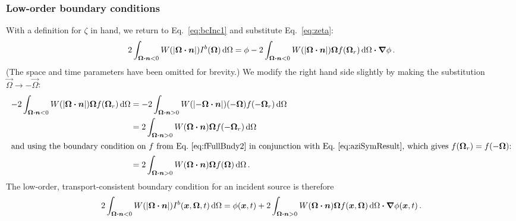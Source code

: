 \subsubsection{Low-order boundary conditions}
With a definition for $\zeta$ in hand, we return to Eq.~\eqref{eq:bcInc1} and
substitute Eq.~\eqref{eq:zeta}:
\begin{equation*}
  2\int_{\bm{\Omega}\bm{\cdot} \bm{n} < 0}
  W(\left| \bm{\Omega} \bm{\cdot} \bm{n} \right|) I^b(\bm{\Omega}) \mathop{}\!\mathrm{d}\Omega
  = \phi
  - 2\int_{\bm{\Omega}\bm{\cdot} \bm{n} < 0} W(\left| \bm{\Omega} \bm{\cdot} \bm{n} \right|)
  \bm{\Omega} f(\bm{\Omega}_r) \mathop{}\!\mathrm{d}\Omega
  \bm{\cdot} \bm{\nabla} \phi \,.
\end{equation*}
(The space and time parameters have been omitted for brevity.)
We modify the right hand side slightly by making the substitution
$\vec{\Omega}\to-\vec{\Omega}$:
\begin{align*}
  - 2\int_{\bm{\Omega}\bm{\cdot} \bm{n} < 0} W(\left| \bm{\Omega} \bm{\cdot} \bm{n} \right|)
  \bm{\Omega} f(\bm{\Omega}_r) \mathop{}\!\mathrm{d}\Omega
  &= 
  - 2\int_{\bm{\Omega}\bm{\cdot} \bm{n} > 0} W(\left| -\bm{\Omega} \bm{\cdot} \bm{n} \right|)
  ( - \bm{\Omega}) f(-\bm{\Omega}_r) \mathop{}\!\mathrm{d}\Omega
  \\
  &= 
  2\int_{\bm{\Omega}\bm{\cdot} \bm{n} > 0} W(\bm{\Omega} \bm{\cdot} \bm{n})
  \bm{\Omega} f(-\bm{\Omega}_r) \mathop{}\!\mathrm{d}\Omega
  \\ 
  \intertext{and using the boundary condition on $f$ from
  Eq.~\eqref{eq:fFullBndy2} in conjunction with Eq.~\eqref{eq:aziSymResult},
  which gives $f(\bm{\Omega}_r) = f(-\bm{\Omega})$:}
  &= 
  2\int_{\bm{\Omega}\bm{\cdot} \bm{n} > 0} W(\bm{\Omega} \bm{\cdot} \bm{n})
  \bm{\Omega} f(\bm{\Omega}) \mathop{}\!\mathrm{d}\Omega \,.
\end{align*}
The low-order, transport-consistent boundary condition for an incident source
is therefore
\begin{equation}\label{eq:loBndy}
  2\int_{\bm{\Omega}\bm{\cdot} \bm{n} < 0}
  W(\left| \bm{\Omega} \bm{\cdot} \bm{n} \right|) I^b(\bm{x}, \bm{\Omega}, t) \mathop{}\!\mathrm{d}\Omega
  = \phi(\bm{x}, t)
  + 2\int_{\bm{\Omega}\bm{\cdot} \bm{n} > 0} W(\bm{\Omega} \bm{\cdot} \bm{n})
  \bm{\Omega} f(\bm{x}, \bm{\Omega}) \mathop{}\!\mathrm{d}\Omega
  \bm{\cdot} \bm{\nabla} \phi(\bm{x}, t) \,.
\end{equation}

